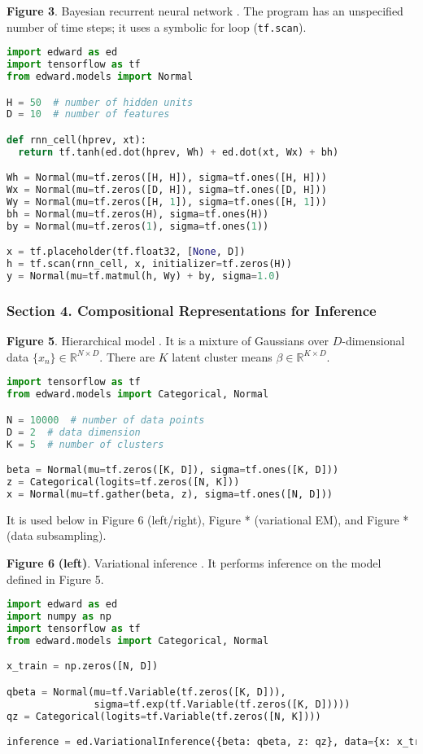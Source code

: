 \textbf{Figure 3}. Bayesian recurrent neural network \citep{neal2012bayesian}.
The program has an unspecified number of time steps; it uses a
symbolic for loop (\texttt{tf.scan}).
\begin{lstlisting}[language=python]
import edward as ed
import tensorflow as tf
from edward.models import Normal

H = 50  # number of hidden units
D = 10  # number of features

def rnn_cell(hprev, xt):
  return tf.tanh(ed.dot(hprev, Wh) + ed.dot(xt, Wx) + bh)

Wh = Normal(mu=tf.zeros([H, H]), sigma=tf.ones([H, H]))
Wx = Normal(mu=tf.zeros([D, H]), sigma=tf.ones([D, H]))
Wy = Normal(mu=tf.zeros([H, 1]), sigma=tf.ones([H, 1]))
bh = Normal(mu=tf.zeros(H), sigma=tf.ones(H))
by = Normal(mu=tf.zeros(1), sigma=tf.ones(1))

x = tf.placeholder(tf.float32, [None, D])
h = tf.scan(rnn_cell, x, initializer=tf.zeros(H))
y = Normal(mu=tf.matmul(h, Wy) + by, sigma=1.0)
\end{lstlisting}

\subsubsection{Section 4. Compositional Representations for Inference}

\textbf{Figure 5}. Hierarchical model \citep{gelman2006data}.
  It is a mixture of Gaussians over
  $D$-dimensional data $\{x_n\}\in\mathbb{R}^{N\times D}$. There are
  $K$ latent cluster means $\beta\in\mathbb{R}^{K\times D}$.
\begin{lstlisting}[language=python]
import tensorflow as tf
from edward.models import Categorical, Normal

N = 10000  # number of data points
D = 2  # data dimension
K = 5  # number of clusters

beta = Normal(mu=tf.zeros([K, D]), sigma=tf.ones([K, D]))
z = Categorical(logits=tf.zeros([N, K]))
x = Normal(mu=tf.gather(beta, z), sigma=tf.ones([N, D]))
\end{lstlisting}
It is used below in Figure 6 (left/right), Figure * (variational EM),
and Figure * (data subsampling).

\textbf{Figure 6} \textbf{(left)}. Variational inference
\citep{jordan1999introduction}.
It performs inference on the model defined in Figure 5.
\begin{lstlisting}[language=python]
import edward as ed
import numpy as np
import tensorflow as tf
from edward.models import Categorical, Normal

x_train = np.zeros([N, D])

qbeta = Normal(mu=tf.Variable(tf.zeros([K, D])),
               sigma=tf.exp(tf.Variable(tf.zeros([K, D]))))
qz = Categorical(logits=tf.Variable(tf.zeros([N, K])))

inference = ed.VariationalInference({beta: qbeta, z: qz}, data={x: x_train})
\end{lstlisting}

